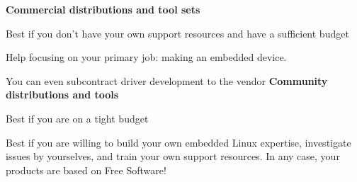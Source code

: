   {\bf Commercial distributions and tool sets}
  \startitemize
  \item Best if you don't have your own support resources and have a
    sufficient budget
  \item Help focusing on your primary job: making an embedded device.
  \item You can even subcontract driver development to the vendor
  \stopitemize
  {\bf Community distributions and tools}
  \startitemize
  \item Best if you are on a tight budget
  \item Best if you are willing to build your own embedded Linux
    expertise, investigate issues by yourselves, and train your own
    support resources.
  \stopitemize
  In any case, your products are based on Free Software!
